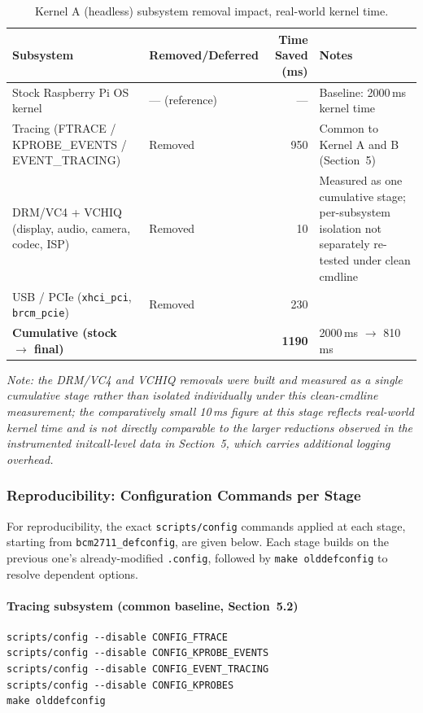 \documentclass[11pt,a4paper]{article}
\begin{document}
\begin{table}[H]
    \centering
    \begin{tabularx}{\textwidth}{@{}p{}p{}rX@{}}
        \toprule
        Subsystem & Removed/Deferred & Time Saved (ms) & Notes \\
        \midrule
        Stock Raspberry Pi OS kernel & --- (reference) & --- & Baseline: 2000\,ms kernel time \\
        Tracing (FTRACE / KPROBE\_EVENTS / EVENT\_TRACING) & Removed & 950 & Common to Kernel A and B (Section~5) \\
        DRM/VC4 + VCHIQ (display, audio, camera, codec, ISP) & Removed & 10 & Measured as one cumulative stage; per-subsystem isolation not separately re-tested under clean cmdline \\
        USB / PCIe (\texttt{xhci\_pci}, \texttt{brcm\_pcie}) & Removed & 230 & \\
        \midrule
        \textbf{Cumulative (stock $\rightarrow$ final)} & & \textbf{1190} & 2000\,ms $\rightarrow$ 810\,ms \\
        \bottomrule
    \end{tabularx}
    \caption{Kernel A (headless) subsystem removal impact, real-world kernel time.}
    \label{tab:kernel-a-impact}
\end{table}
 
\textit{Note: the DRM/VC4 and VCHIQ removals were built and measured as a single cumulative stage rather than isolated individually under this clean-cmdline measurement; the comparatively small 10\,ms figure at this stage reflects real-world kernel time and is not directly comparable to the larger reductions observed in the instrumented initcall-level data in Section~5, which carries additional logging overhead.}

\subsubsection*{Reproducibility: Configuration Commands per Stage}

For reproducibility, the exact \texttt{scripts/config} commands applied at each stage, starting from \texttt{bcm2711\_defconfig}, are given below. Each stage builds on the previous one's already-modified \texttt{.config}, followed by \texttt{make olddefconfig} to resolve dependent options.

\paragraph{Tracing subsystem (common baseline, Section~5.2)}
\begin{lstlisting}
scripts/config --disable CONFIG_FTRACE
scripts/config --disable CONFIG_KPROBE_EVENTS
scripts/config --disable CONFIG_EVENT_TRACING
scripts/config --disable CONFIG_KPROBES
make olddefconfig
\end{lstlisting}
\end{document}
